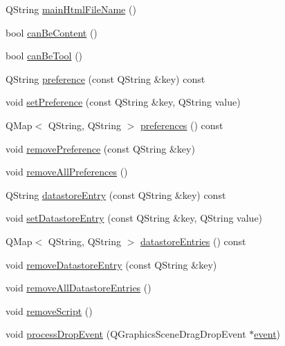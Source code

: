 \begin{DoxyCompactItemize}
Q\-String \hyperlink{class_u_b_graphics_widget_item_aba1b6e58cb9b8b0dec08d4cec2e5ed7d}{main\-Html\-File\-Name} ()
\item 
bool \hyperlink{class_u_b_graphics_widget_item_a837bf0f0feea1d2e9caa315575349290}{can\-Be\-Content} ()
\item 
bool \hyperlink{class_u_b_graphics_widget_item_a4edb34c8527b85e8c1deef78188af3fc}{can\-Be\-Tool} ()
\item 
Q\-String \hyperlink{class_u_b_graphics_widget_item_a5ef1829e940853a2eaac69c250db56e8}{preference} (const Q\-String \&key) const 
\item 
void \hyperlink{class_u_b_graphics_widget_item_a52b2fd4a9042146506fd4175de913988}{set\-Preference} (const Q\-String \&key, Q\-String value)
\item 
Q\-Map$<$ Q\-String, Q\-String $>$ \hyperlink{class_u_b_graphics_widget_item_a8f6c733f621b9388f7b01ed60e0bac19}{preferences} () const 
\item 
void \hyperlink{class_u_b_graphics_widget_item_a3a9a8ac964a30eeff16acbb6eea191d6}{remove\-Preference} (const Q\-String \&key)
\item 
void \hyperlink{class_u_b_graphics_widget_item_a616c8333edae119fd07a95aa5c313c90}{remove\-All\-Preferences} ()
\item 
Q\-String \hyperlink{class_u_b_graphics_widget_item_ac1abdfe7be891456bbbc9992697d2b52}{datastore\-Entry} (const Q\-String \&key) const 
\item 
void \hyperlink{class_u_b_graphics_widget_item_ad3ed087bab8549dcd0aedbf369bfad25}{set\-Datastore\-Entry} (const Q\-String \&key, Q\-String value)
\item 
Q\-Map$<$ Q\-String, Q\-String $>$ \hyperlink{class_u_b_graphics_widget_item_a1f4e5293e44ca23e2d323ca6f6e92c74}{datastore\-Entries} () const 
\item 
void \hyperlink{class_u_b_graphics_widget_item_ae584a5a79f3b19d3c56505bac2d12098}{remove\-Datastore\-Entry} (const Q\-String \&key)
\item 
void \hyperlink{class_u_b_graphics_widget_item_a29c5f3e633880d174fc0ba7328b6ca2c}{remove\-All\-Datastore\-Entries} ()
\item 
void \hyperlink{class_u_b_graphics_widget_item_a9692ad705e7bffa2e4012ef76533aaca}{remove\-Script} ()
\item 
void \hyperlink{class_u_b_graphics_widget_item_ab94d12c758de5bfd42363815a66137b3}{process\-Drop\-Event} (Q\-Graphics\-Scene\-Drag\-Drop\-Event $\ast$\hyperlink{class_u_b_graphics_widget_item_af3a35c5d51a0da4a6c226b733125c74c}{event})

\end{DoxyCompactItemize}
